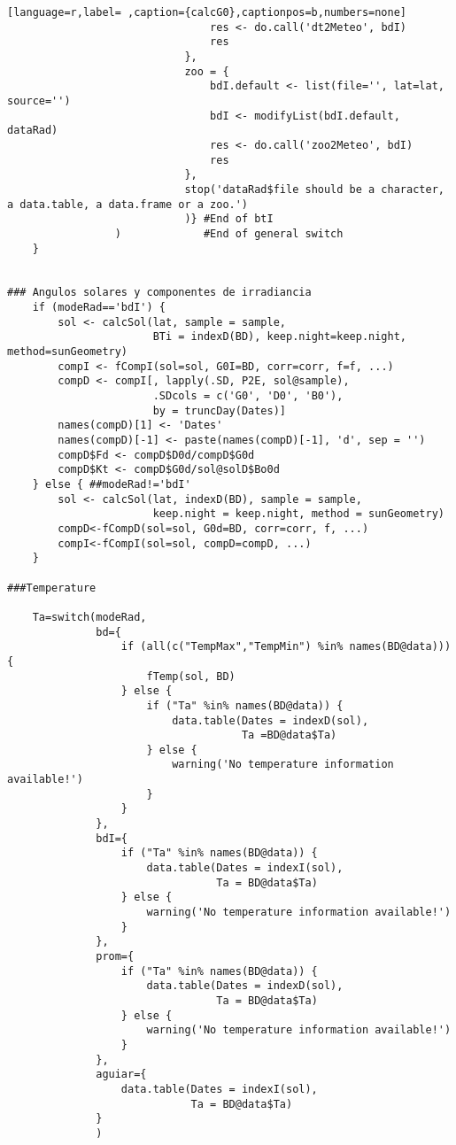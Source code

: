 \begin{lstlisting}[language=r,label= ,caption={calcG0},captionpos=b,numbers=none]
                                res <- do.call('dt2Meteo', bdI)
                                res
                            },
                            zoo = {
                                bdI.default <- list(file='', lat=lat, source='')
                                bdI <- modifyList(bdI.default, dataRad)
                                res <- do.call('zoo2Meteo', bdI)
                                res
                            },
                            stop('dataRad$file should be a character, a data.table, a data.frame or a zoo.')
                            )} #End of btI
                 )             #End of general switch    
    }


### Angulos solares y componentes de irradiancia
    if (modeRad=='bdI') {
        sol <- calcSol(lat, sample = sample,
                       BTi = indexD(BD), keep.night=keep.night, method=sunGeometry)
        compI <- fCompI(sol=sol, G0I=BD, corr=corr, f=f, ...)
        compD <- compI[, lapply(.SD, P2E, sol@sample),
                       .SDcols = c('G0', 'D0', 'B0'),
                       by = truncDay(Dates)]
        names(compD)[1] <- 'Dates'
        names(compD)[-1] <- paste(names(compD)[-1], 'd', sep = '')
        compD$Fd <- compD$D0d/compD$G0d
        compD$Kt <- compD$G0d/sol@solD$Bo0d
    } else { ##modeRad!='bdI'
        sol <- calcSol(lat, indexD(BD), sample = sample,
                       keep.night = keep.night, method = sunGeometry)
        compD<-fCompD(sol=sol, G0d=BD, corr=corr, f, ...)
        compI<-fCompI(sol=sol, compD=compD, ...)
    }

###Temperature

    Ta=switch(modeRad,
              bd={
                  if (all(c("TempMax","TempMin") %in% names(BD@data))) {
                      fTemp(sol, BD)
                  } else {
                      if ("Ta" %in% names(BD@data)) {
                          data.table(Dates = indexD(sol),
                                     Ta =BD@data$Ta)
                      } else {
                          warning('No temperature information available!')
                      }
                  }
              },
              bdI={
                  if ("Ta" %in% names(BD@data)) {
                      data.table(Dates = indexI(sol),
                                 Ta = BD@data$Ta)
                  } else {
                      warning('No temperature information available!')
                  }
              },
              prom={
                  if ("Ta" %in% names(BD@data)) {
                      data.table(Dates = indexD(sol),
                                 Ta = BD@data$Ta)
                  } else {
                      warning('No temperature information available!')
                  }                  
              },
              aguiar={ 
                  data.table(Dates = indexI(sol),
                             Ta = BD@data$Ta)
              }
              )


\end{lstlisting}
